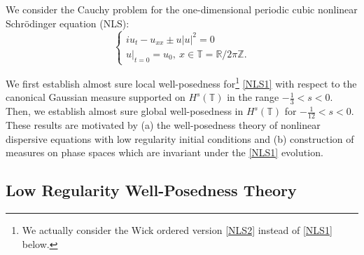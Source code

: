 \documentclass[11pt]{amsart}
\numberwithin{equation}{section} \numberwithin{theorem}{section}
\begin{document}
We consider the Cauchy problem for the one-dimensional periodic cubic nonlinear Schr\"odinger equation (NLS): 
\begin{equation}
	\label{NLS1} 
	\begin{cases}
		i u_t - u_{xx} \pm u |u|^2 =0 \\
		u|_{t= 0} = u_0, ~x \in {\mathbb{T}} = {\mathbb{R}} / 2 \pi {\mathbb{Z}}.
	\end{cases}
\end{equation}

{
\noindent}
We first establish almost sure local well-posedness 
for{\footnote{We actually consider the Wick ordered version \eqref{NLS2} instead of \eqref{NLS1} below.}} \eqref{NLS1} 
with respect to the canonical Gaussian measure supported on $H^s ({\mathbb{T}})$ in the range $-\frac{1}{3} < s < 0$. 
Then, we establish almost sure global well-posedness 
in $H^s({\mathbb{T}})$ for $-\frac{1}{12} < s < 0$. 
These results are motivated by (a) the well-posedness theory of nonlinear dispersive equations with low regularity initial conditions and (b) construction of measures on phase spaces which are invariant under the \eqref{NLS1} evolution.

\subsection{Low Regularity Well-Posedness Theory}
\end{document}
